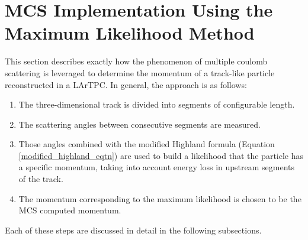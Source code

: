 \documentclass[a4paper,11pt]{article}
\begin{document}
\section{MCS Implementation Using the Maximum Likelihood Method}\label{MCS_technique_section}

This section describes exactly how the phenomenon of multiple coulomb scattering is leveraged to determine the momentum of a track-like particle reconstructed in a LArTPC. In general, the approach is as follows:
\begin{enumerate}
\item The three-dimensional track is divided into segments of configurable length.
\item The scattering angles between consecutive segments are measured.
\item Those angles combined with the modified Highland formula (Equation \ref{modified_highland_eqtn}) are used to build a likelihood that the particle has a specific momentum, taking into account energy loss in upstream segments of the track.
\item The momentum corresponding to the maximum likelihood is chosen to be the MCS computed momentum.
\end{enumerate}
Each of these steps are discussed in detail in the following subsections.\\

\end{document}
